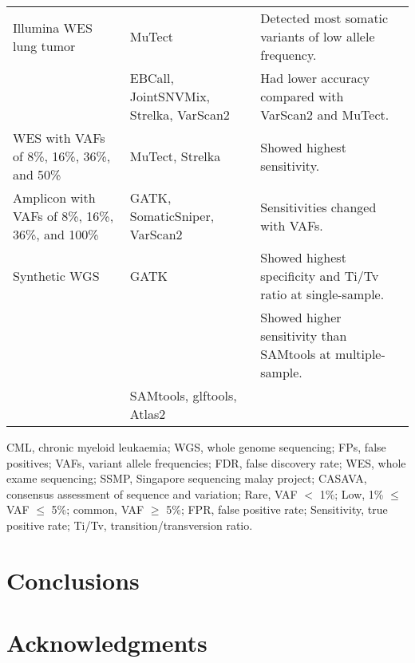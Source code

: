 \documentclass[11pt,reqno]{amsart}
\begin{document}
\begin{landscape}
\begin{table}[htbp]
\begin{threeparttable}
\begin{tabular}{rlrr}
    \multicolumn{1}{l}{Illumina WES lung tumor} & MuTect & \multicolumn{1}{l}{Detected most somatic variants of low allele frequency.} &  \\
          & EBCall, JointSNVMix, Strelka, VarScan2 & \multicolumn{1}{l}{Had lower accuracy compared with VarScan2 and MuTect.} &  \\
    \midrule
    \multicolumn{1}{l}{WES with VAFs of 8\%, 16\%, 36\%, and 50\%} & MuTect, Strelka & \multicolumn{1}{l}{Showed highest sensitivity.} &  \citealt{Xu2014}\\
    \multicolumn{1}{l}{Amplicon with VAFs of 8\%, 16\%, 36\%, and 100\%} & GATK, SomaticSniper, VarScan2 & \multicolumn{1}{l}{Sensitivities changed with VAFs.} &  \\
    \midrule
    \multicolumn{1}{l}{Synthetic WGS} & GATK  & \multicolumn{1}{l}{Showed highest specificity and Ti/Tv ratio at single-sample. } &  \citealt{liu2013variant}\\
          &       & \multicolumn{1}{l}{Showed higher sensitivity than SAMtools at multiple-sample.} &  \\
          & SAMtools, glftools, Atlas2 &       &  \\
    \bottomrule
    \end{tabular}
   \begin{tablenotes}
	\item CML, chronic myeloid leukaemia;
WGS, whole genome sequencing;
FPs, false positives;
VAFs, variant allele frequencies;
FDR, false discovery rate;
WES, whole exame sequencing;
SSMP, Singapore sequencing malay project;
CASAVA, consensus assessment of sequence and variation;
Rare, VAF $<$ 1\%; Low, 1\% $\leqslant$ VAF $\leqslant$  5\%; common, VAF $\geqslant$ 5\%;
FPR, false positive rate;
Sensitivity, true positive rate;
Ti/Tv, transition/transversion ratio.
    \end{tablenotes}
\end{threeparttable}
\end{table}
\end{landscape}




\section{Conclusions}

\section{Acknowledgments}




\end{document}
